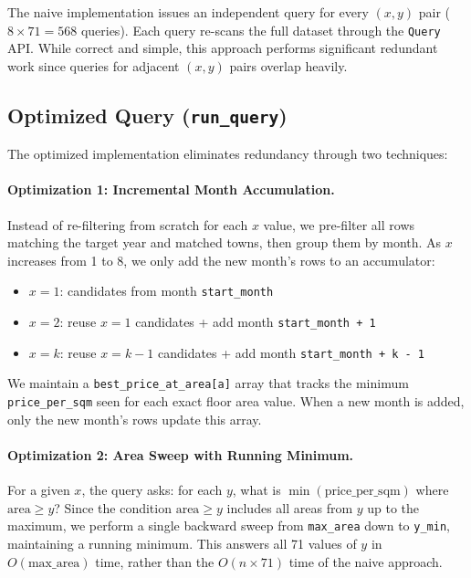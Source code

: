 \documentclass[11pt,a4paper]{article}
\begin{document}
The naive implementation issues an independent query for every $(x, y)$ pair ($8 \times 71 = 568$ queries). Each query re-scans the full dataset through the \texttt{Query} API. While correct and simple, this approach performs significant redundant work since queries for adjacent $(x, y)$ pairs overlap heavily.

\subsection{Optimized Query (\texttt{run\_query})}

The optimized implementation eliminates redundancy through two techniques:

\paragraph{Optimization 1: Incremental Month Accumulation.}
Instead of re-filtering from scratch for each $x$ value, we pre-filter all rows matching the target year and matched towns, then group them by month. As $x$ increases from 1 to 8, we only add the new month's rows to an accumulator:

\begin{itemize}[nosep]
    \item $x = 1$: candidates from month \texttt{start\_month}
    \item $x = 2$: reuse $x = 1$ candidates + add month \texttt{start\_month + 1}
    \item $x = k$: reuse $x = k{-}1$ candidates + add month \texttt{start\_month + k - 1}
\end{itemize}

We maintain a \texttt{best\_price\_at\_area[a]} array that tracks the minimum \texttt{price\_per\_sqm} seen for each exact floor area value. When a new month is added, only the new month's rows update this array.

\paragraph{Optimization 2: Area Sweep with Running Minimum.}
For a given $x$, the query asks: for each $y$, what is $\min(\text{price\_per\_sqm})$ where $\text{area} \geq y$? Since the condition $\text{area} \geq y$ includes all areas from $y$ up to the maximum, we perform a single backward sweep from \texttt{max\_area} down to \texttt{y\_min}, maintaining a running minimum. This answers all 71 values of $y$ in $O(\text{max\_area})$ time, rather than the $O(n \times 71)$ time of the naive approach.
\end{document}
